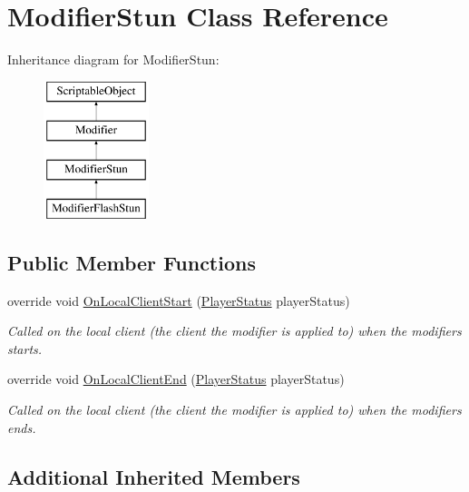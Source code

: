 \hypertarget{class_modifier_stun}{}\section{Modifier\+Stun Class Reference}
\label{class_modifier_stun}
Inheritance diagram for Modifier\+Stun\+:\begin{figure}[H]
\begin{center}
\leavevmode
\includegraphics[height=4.000000cm]{class_modifier_stun}
\end{center}
\end{figure}
\subsection*{Public Member Functions}
\begin{DoxyCompactItemize}
\item 
override void \hyperlink{class_modifier_stun_a2798f3de724e40e72bbc203b6aece7e5}{On\+Local\+Client\+Start} (\hyperlink{class_player_status}{Player\+Status} player\+Status)
\begin{DoxyCompactList}\small\item\em Called on the local client (the client the modifier is applied to) when the modifiers starts. \end{DoxyCompactList}\item 
override void \hyperlink{class_modifier_stun_acb8d45decc6446515b0492ae57684092}{On\+Local\+Client\+End} (\hyperlink{class_player_status}{Player\+Status} player\+Status)
\begin{DoxyCompactList}\small\item\em Called on the local client (the client the modifier is applied to) when the modifiers ends. \end{DoxyCompactList}\end{DoxyCompactItemize}
\subsection*{Additional Inherited Members}


